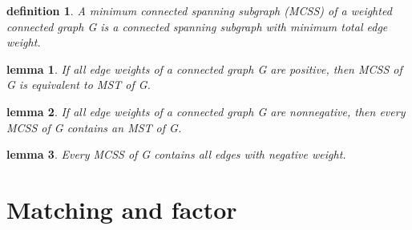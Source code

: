 \documentclass[2pt]{article}
\newtheorem{definition}{definition}
\newtheorem{lemma}{lemma}
\begin{document}
\begin{CJK*}{UTF8}{bkai}
\begin{paracol}{2}
    \begin{definition}
         A minimum connected spanning subgraph (MCSS) of a weighted connected
 graph G is a connected spanning subgraph with minimum total edge weight.
    \end{definition}

    \begin{lemma}
        If all edge weights of a connected graph G are positive, then MCSS of G is
 equivalent to MST of G.
    \end{lemma}

    \begin{lemma}
        If all edge weights of a connected graph G are nonnegative, then every MCSS
 of G contains an MST of G.
    \end{lemma}

    \begin{lemma}
         Every MCSS of G contains all edges with negative weight.
    \end{lemma}

\end{paracol}
\vspace{2cm} %

\section*{Matching and factor}
\begin{paracol}{2} %
    \switchcolumn[0]

\end{paracol}

\end{CJK*}
\end{document}
